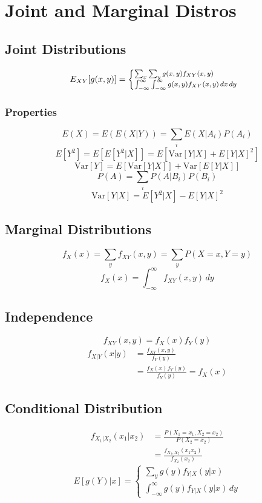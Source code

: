 \section{Joint and Marginal Distros}
	\subsection{Joint Distributions}
		\[ \footnotesize
			E_{XY}[g(x,y)] =
			\begin{cases}
				\sum_{x}\sum_{y} g(x,y) f_{XY}(x,y) \\
				\int_{-\infty}^{\infty}\int_{-\infty}^{\infty} g(x,y) f_{XY}(x,y)\,dx\,dy
			\end{cases}
		\]
		\subsubsection{Properties}
			\[E(X) = E(E(X|Y)) = \sum_{i} E(X|A_i) P(A_i)\]
			{\footnotesize\[ E[Y^2] = E[E[Y^2|X]] = E[\text{Var}[Y|X] + E[Y|X]^2]\]}
			\[ \text{Var}[Y] = E[\text{Var}[Y|X]] + \text{Var}[E[Y|X]] \]
			\[P(A) = \sum_{i} P(A|B_i)P(B_i)\]
			\[\text{Var}[Y|X] = E[Y^2|X] - E[Y|X]^2\]
	
	\subsection{Marginal Distributions}
		\[ f_X(x) = \sum_{y} f_{XY}(x,y) = \sum_{y} P(X=x,Y=y) \]
		\[ f_X(x) = \int_{-\infty}^{\infty} f_{XY}(x,y)\,dy \]
	
	\subsection{Independence}
		\[f_{XY}(x,y) = f_X(x)f_Y(y) \]
		\begin{equation*}
			\begin{split}
				f_{X|Y}(x|y) &= \frac{f_{XY}(x,y)}{f_Y(y)} \\ &= \frac{f_X(x)f_Y(y)}{f_Y(y)} = f_X(x)
			\end{split}
		\end{equation*}
		
	\subsection{Conditional Distribution}
		\begin{equation*}
			\begin{split}
				f_{X_1|X_2}(x_1|x_2) &= \frac{P(X_1=x_1, X_2=x_2)}{P(X_2=x_2)} \\ 
				&= \frac{f_{X_1,X_2} (x_1x_2)}{f_{X_2}(x_2)}
			\end{split}
		\end{equation*}
		\[ E[g(Y)|x] = \begin{cases}
			\sum_{y} g(y) f_{Y|X}(y|x) \\
			\int_{-\infty}^{\infty} g(y)f_{Y|X}(y|x)\,dy
		\end{cases}\]


	
		
	